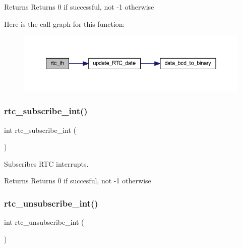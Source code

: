 \begin{DoxyReturn}{Returns}
Returns 0 if successful, not -\/1 otherwise 
\end{DoxyReturn}
Here is the call graph for this function\+:
\nopagebreak
\begin{figure}[H]
\begin{center}
\leavevmode
\includegraphics[width=350pt]{group__rtc_ga57f7116af216e3779ad9d6e98351d329_cgraph}
\end{center}
\end{figure}
\mbox{\label{group__rtc_gabd8de825e876e8ef94c64ac616f68a11}} 
\subsubsection{\texorpdfstring{rtc\_subscribe\_int()}{rtc\_subscribe\_int()}}
{\footnotesize\ttfamily int rtc\+\_\+subscribe\+\_\+int (\begin{DoxyParamCaption}{ }\end{DoxyParamCaption})}



Subscribes R\+TC interrupts. 

\begin{DoxyReturn}{Returns}
Returns 0 if succesful, not -\/1 otherwise 
\end{DoxyReturn}
\mbox{\label{group__rtc_gab8f17bf5280c908c8b199a90fefcc758}} 
\subsubsection{\texorpdfstring{rtc\_unsubscribe\_int()}{rtc\_unsubscribe\_int()}}
{\footnotesize\ttfamily int rtc\+\_\+unsubscribe\+\_\+int (\begin{DoxyParamCaption}{ }\end{DoxyParamCaption})}



